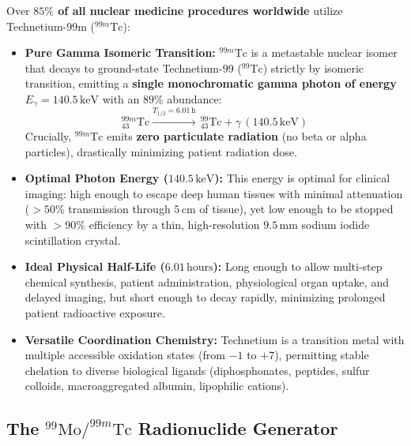 \documentclass[11pt,a4paper]{article}
\begin{document}
Over \textbf{$85\%$ of all nuclear medicine procedures worldwide} utilize Technetium-99m ($^{99m}\text{Tc}$):
\begin{itemize}[leftmargin=*]
    \item \textbf{Pure Gamma Isomeric Transition:} $^{99m}\text{Tc}$ is a metastable nuclear isomer that decays to ground-state Technetium-99 ($^{99}\text{Tc}$) strictly by isomeric transition, emitting a \textbf{single monochromatic gamma photon of energy $E_\gamma = 140.5\,\text{keV}$} with an $89\%$ abundance:
    \begin{equation}
        ^{99m}_{43}\text{Tc} \xrightarrow{T_{1/2} = 6.01\,\text{h}} \, ^{99}_{43}\text{Tc} + \gamma \, (140.5\,\text{keV})
    \end{equation}
    Crucially, $^{99m}\text{Tc}$ emits \textbf{zero particulate radiation} (no beta or alpha particles), drastically minimizing patient radiation dose.
    \item \textbf{Optimal Photon Energy ($140.5\,\text{keV}$):} This energy is optimal for clinical imaging: high enough to escape deep human tissues with minimal attenuation ($> 50\%$ transmission through $5\,\text{cm}$ of tissue), yet low enough to be stopped with $> 90\%$ efficiency by a thin, high-resolution $9.5\,\text{mm}$ sodium iodide scintillation crystal.
    \item \textbf{Ideal Physical Half-Life ($6.01\,\text{hours}$):} Long enough to allow multi-step chemical synthesis, patient administration, physiological organ uptake, and delayed imaging, but short enough to decay rapidly, minimizing prolonged patient radioactive exposure.
    \item \textbf{Versatile Coordination Chemistry:} Technetium is a transition metal with multiple accessible oxidation states (from $-1$ to $+7$), permitting stable chelation to diverse biological ligands (diphosphonates, peptides, sulfur colloids, macroaggregated albumin, lipophilic cations).
\end{itemize}

\subsection{The \texorpdfstring{$^{99}\text{Mo}/^{99m}\text{Tc}$}{99Mo/99mTc} Radionuclide Generator}
\end{document}
